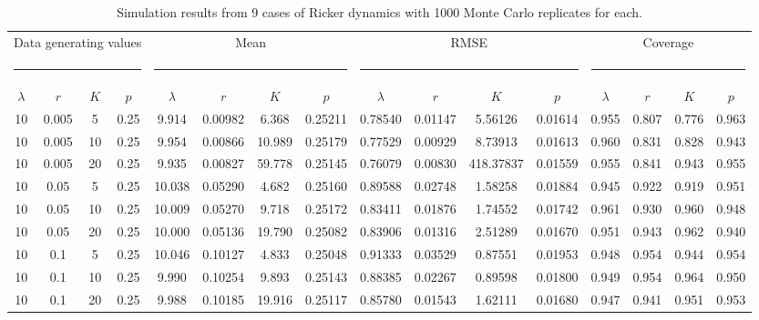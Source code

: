 \documentclass{article}
\begin{document}
\begin{table}
  \centering
  \footnotesize
  \caption{Simulation results from 9 cases of Ricker dynamics with 1000 Monte Carlo replicates for each.}
  \begin{tabular}{cccccccccccccccc}
    \hline
    \multicolumn{4}{c}{Data generating values}&
    \multicolumn{4}{c}{Mean} &
    \multicolumn{4}{c}{RMSE} &
    \multicolumn{4}{c}{Coverage} \\
    \multicolumn{4}{c}{\rule{4cm}{1pt}} &
    \multicolumn{4}{c}{\rule{4cm}{1pt}} &
    \multicolumn{4}{c}{\rule{4cm}{1pt}} &
    \multicolumn{4}{c}{\rule{4cm}{1pt}} \\
    $\lambda$ & $r$ & $K$ & $p$ & $\lambda$ & $r$ & $K$ & $p$ & $\lambda$ & $r$ & $K$ &
    $p$ & $\lambda$ & $r$ & $K$ & $p$ \\
    \hline
10	&0.005	&5	&0.25	&9.914 &0.00982  &6.368 &0.25211	&0.78540 &0.01147   &5.56126 &0.01614	&0.955 &0.807 &0.776 &0.963\\
10	&0.005	&10	&0.25	&9.954 &0.00866 &10.989 &0.25179 &0.77529 &0.00929   &8.73913 &0.01613  &0.960 &0.831 &0.828 &0.943\\
10	&0.005	&20	&0.25	&9.935 &0.00827 &59.778 &0.25145 &0.76079 &0.00830 &418.37837 &0.01559  &0.955 &0.841 &0.943 &0.955\\
10	&0.05	&5	&0.25	&10.038 &0.05290  &4.682 &0.25160 &0.89588 &0.02748   &1.58258 &0.01884  &0.945 &0.922 &0.919 &0.951\\
10	&0.05	&10	&0.25	&10.009 &0.05270  &9.718 &0.25172 &0.83411 &0.01876   &1.74552 &0.01742  &0.961 &0.930 &0.960 &0.948\\
10	&0.05	&20	&0.25	&10.000 &0.05136 &19.790 &0.25082 &0.83906 &0.01316   &2.51289 &0.01670  &0.951 &0.943 &0.962 &0.940\\
10	&0.1	&5	&0.25	&10.046 &0.10127  &4.833 &0.25048 &0.91333 &0.03529   &0.87551 &0.01953  &0.948 &0.954 &0.944 &0.954\\
10	&0.1	&10	&0.25	&9.990 &0.10254  &9.893 &0.25143 &0.88385 &0.02267   &0.89598 &0.01800  &0.949 &0.954 &0.964 &0.950\\
10	&0.1	&20	&0.25	&9.988 &0.10185 &19.916 &0.25117 &0.85780 &0.01543   &1.62111 &0.01680  &0.947 &0.941 &0.951 &0.953\\
  \hline
  \end{tabular}
  \label{tab:simricker}
\end{table}
\end{document}

